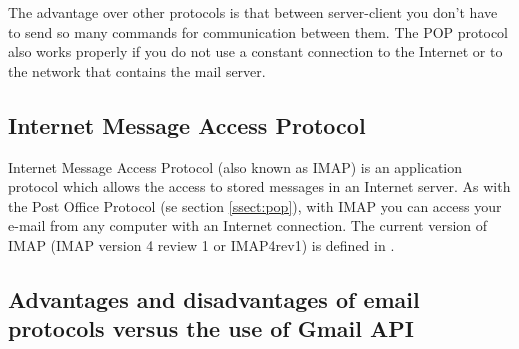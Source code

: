 The advantage over other protocols is that between server-client you don't have to send so many commands for communication between them. The POP protocol also works properly if you do not use a constant connection to the Internet or to the network that contains the mail server.

\subsection{Internet Message Access Protocol} \label{ssect:imap}

Internet Message Access Protocol (also known as IMAP) is an application protocol which allows the access to stored messages in an Internet server. As with the Post Office Protocol (se section \ref{ssect:pop}), with IMAP you can access your e-mail from any computer with an Internet connection. The current version of IMAP (IMAP version 4 review 1 or IMAP4rev1) is defined in \cite{rfc3501}.

\subsection{Advantages and disadvantages of email protocols versus the use of Gmail API} \label{ssect:protvsapi}
